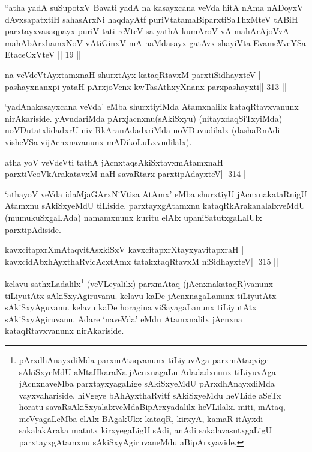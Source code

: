 \begin{shl}
``atha yadA suSupotxV Bavati yadA na kasayxcana veVda
hitA nAma nADoyxV dAvxsapatxtiH sahasArxNi haqdayAtf
puriVtatamaBiparxtiSaThxMteV tABiH parxtayxvasaqpayx puriV
tati reVteV sa yathA kumAroV vA mahArAjoVvA 
mahAbArxhamxNoV vA\s tiGinxV mA naMdasayx gatAvx shayiVta 
EvameVveYSa EtaceCxVteV || 19 ||
\end{shl}


\begin{shl}
na veVdeVtAyxtamxnaH shurxtAyx kataqRtavxM parxtiSidhayxteV |
pashayxnanxpi yataH pArxjoVcnx kwTasAthxyXnanx parxpashayxti\hfill || 313 ||
\end{shl}

\begin{artha}
`yadAnakasayxcana veVda' eMba shurxtiyiMda Atamxnalilx kataqRtavxvanunx  nirAkariside. yAvudariMda pArxjacnxnu(sAkiSxyu) (nitayxdaqSiTxyiMda)  noVDutatxlidadxrU niviRkAra\-nAdadxriMda noVDuvudilalx (dashaRnAdi visheVSa vijAcnxnavanunx mADikoLuLxvudilalx).
\end{artha}


\begin{shl}
\footnotemark[1]atha yoV veVdeVti tathA jAcnxtaqsAkiSxtavxmAtamxnaH |
parxtiVcoV\s kArakatavxM naH savaRtarx parxtipAdayxteV\hfill || 314 ||
\end{shl}

\begin{artha}
`athayoV veVda idaMjaGArxNiVtisa AtAmx' eMba shurxtiyU jAcnxnakataRnigU  Atamxnu sAkiSxyeMdU tiLiside. parxtayxgAtamxnu kataqRkArakanalalxveMdU (mumukuSx\-gaLAda) namamxnunx kuritu elAlx upaniSatutxgaLalUlx parxtipAdiside.
\end{artha}


\begin{shl}
kavxcitapxrXmAtaqvitAsxkiSxV kavxcitapxrXtayxyavitapxraH |
kavxcidAbxhAyxthaRvicAcx\s\s tAmx tatakxtaqRtavxM niSidhayxteV\hfill || 315 ||
\end{shl}

\begin{artha}
kelavu sathxLadalilx\footnote[2]{pArxdhAnayxdiMda parxmAtaqvanunx  tiLiyuvAga parxmAtaqvige sAkiSxyeMdU aMtaHkaraNa jAcnxnagaLu Adadadxnunx  tiLiyuvAga jAcnxnaveMba parxtayxyagaLige sAkiSxyeMdU pArxdhAnayxdiMda  vayxvahariside. hiVgeye bAhAyxthaRvitf sAkiSxyeMdu heVLide aSeTx horatu  savaRsAkiSxyalalxveMdaBipArxyadalilx heVLilalx. miti, mAtaq, meVyagaLeMba elAlx BAgakUkx kataqR, kirxyA, kamaR itAyxdi sakalakAraka matutx kirxyegaLigU sAdi, anAdi sakalavasutxgaLigU parxtayxgAtamxnu sAkiSxyAgiruvaneMdu aBipArxyavide.} (veVLeyalilx) parxmAtaq (jAcnxnakataqR)vanunx tiLiyutAtx sAkiSxyAgiruvanu. kelavu kaDe jAcnxnagaLanunx tiLiyutAtx sAkiSxyAguvanu. kelavu kaDe horagina viSayagaLanunx tiLiyutAtx sAkiSxyAgiruvanu. Adare `naveVda' eMdu Atamxnalilx jAcnxna kataqRtavxvanunx nirAkariside.
\end{artha}

